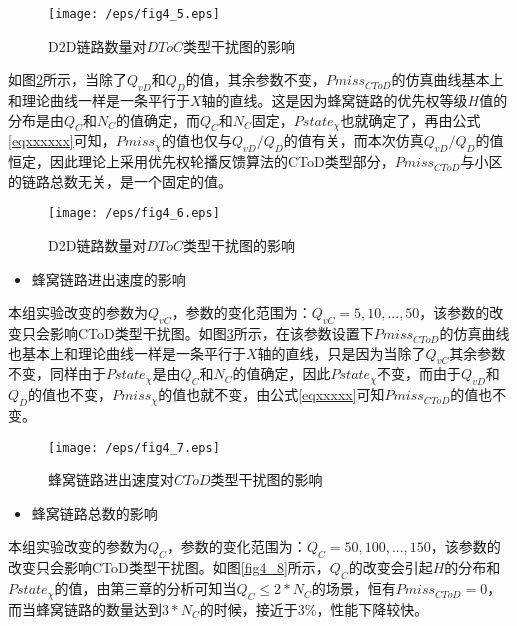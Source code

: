 \documentclass[figurelist,tablelist,algorithmlist,nomlist,masters]{seuthesix}
\begin{document}
	
	\begin{figure}[!h]
		\centering
		\texttt{[image: /eps/fig4\_5.eps]}
		\caption{D2D链路数量对$DToC$类型干扰图的影响}
		\label{fig4_5}
	\end{figure}
	
	
	如图\ref{fig4_6}所示，当除了$Q_{vD}$和$Q_D$的值，其余参数不变，$Pmiss_{CToD}$的仿真曲线基本上和理论曲线一样是一条平行于$X$轴的直线。这是因为蜂窝链路的优先权等级$H$值的分布是由$Q_C$和$N_C$的值确定，而$Q_C$和$N_C$固定，$Pstate_{\chi }$也就确定了，再由公式\ref{eqxxxxxx}可知，$Pmiss_{\chi }$的值也仅与$Q_{vD}/Q_D$的值有关，而本次仿真$Q_{vD}/Q_D$的值恒定，因此理论上采用优先权轮播反馈算法的CToD类型部分，$Pmiss_{CToD}$与小区的链路总数无关，是一个固定的值。
	
	\begin{figure}[!h]
		\centering
		\texttt{[image: /eps/fig4\_6.eps]}
		\caption{D2D链路数量对$DToC$类型干扰图的影响}
		\label{fig4_6}
	\end{figure}
	
	
	\begin{itemize}
		\item 蜂窝链路进出速度的影响
	\end{itemize}
	
	本组实验改变的参数为$Q_{vC}$，参数的变化范围为：$Q_{vC} = 5,10,...,50$，该参数的改变只会影响CToD类型干扰图。如图\ref{fig4_7}所示，在该参数设置下$Pmiss_{CToD}$的仿真曲线也基本上和理论曲线一样是一条平行于$X$轴的直线，只是因为当除了$Q_{vC}$其余参数不变，同样由于$Pstate_{\chi }$是由$Q_C$和$N_C$的值确定，因此$Pstate_{\chi }$不变，而由于$Q_{vD}$和$Q_D$的值也不变，$Pmiss_{\chi }$的值也就不变，由公式\ref{eqxxxxx}可知$Pmiss_{CToD}$的值也不变。
	
	\begin{figure}[!h]
		\centering
		\texttt{[image: /eps/fig4\_7.eps]}
		\caption{蜂窝链路进出速度对$CToD$类型干扰图的影响}
		\label{fig4_7}
	\end{figure}
	
	
	\begin{itemize}
		\item 蜂窝链路总数的影响
	\end{itemize}
	
	本组实验改变的参数为$Q_{C}$，参数的变化范围为：$Q_{C} = 50,100,...,150$，该参数的改变只会影响CToD类型干扰图。如图\ref{fig4_8}所示，$Q_{C}$的改变会引起$H$的分布和$Pstate_{\chi }$的值，由第三章的分析可知当$Q_{C} \le 2 * N_C$的场景，恒有$Pmiss_{CToD} = 0$，而当蜂窝链路的数量达到$3 * N_{C}$的时候，接近于$3\%$，性能下降较快。
	
\end{document}

